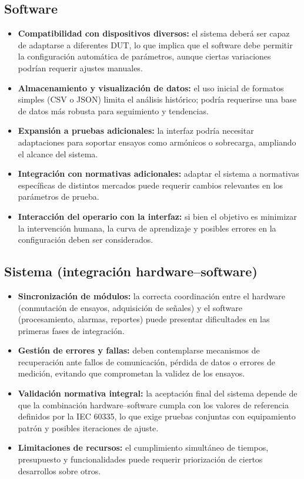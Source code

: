 \documentclass[a4paper,12pt]{article}
\begin{document}
\subsection{Software}
\begin{itemize}
    \item \textbf{Compatibilidad con dispositivos diversos:} el sistema deberá ser capaz de adaptarse a diferentes DUT, lo que implica que el software debe permitir la configuración automática de parámetros, aunque ciertas variaciones podrían requerir ajustes manuales.
    \item \textbf{Almacenamiento y visualización de datos:} el uso inicial de formatos simples (CSV o JSON) limita el análisis histórico; podría requerirse una base de datos más robusta para seguimiento y tendencias.
    \item \textbf{Expansión a pruebas adicionales:} la interfaz podría necesitar adaptaciones para soportar ensayos como armónicos o sobrecarga, ampliando el alcance del sistema.
    \item \textbf{Integración con normativas adicionales:} adaptar el sistema a normativas específicas de distintos mercados puede requerir cambios relevantes en los parámetros de prueba.
    \item \textbf{Interacción del operario con la interfaz:} si bien el objetivo es minimizar la intervención humana, la curva de aprendizaje y posibles errores en la configuración deben ser considerados.
\end{itemize}

\subsection{Sistema (integración hardware--software)}
\begin{itemize}
    \item \textbf{Sincronización de módulos:} la correcta coordinación entre el hardware (conmutación de ensayos, adquisición de señales) y el software (procesamiento, alarmas, reportes) puede presentar dificultades en las primeras fases de integración.
    \item \textbf{Gestión de errores y fallas:} deben contemplarse mecanismos de recuperación ante fallos de comunicación, pérdida de datos o errores de medición, evitando que comprometan la validez de los ensayos.
    \item \textbf{Validación normativa integral:} la aceptación final del sistema depende de que la combinación hardware--software cumpla con los valores de referencia definidos por la IEC 60335, lo que exige pruebas conjuntas con equipamiento patrón y posibles iteraciones de ajuste.
    \item \textbf{Limitaciones de recursos:} el cumplimiento simultáneo de tiempos, presupuesto y funcionalidades puede requerir priorización de ciertos desarrollos sobre otros.
\end{itemize}
\end{document}
